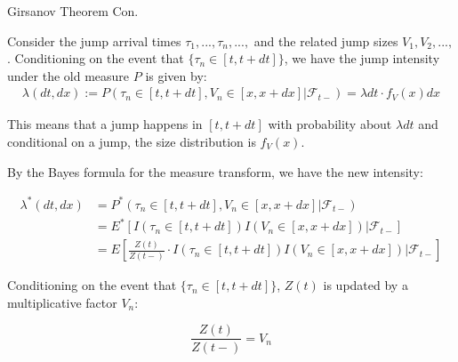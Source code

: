 \documentclass{beamer}
\begin{document}
\begin{frame}{Girsanov Theorem Con.}

    {\footnotesize \footnotesize
    \par Consider the jump arrival times $\tau_1, ..., \tau_n, ...,$ and the related jump sizes $V_1, V_2, ...,$. 
    Conditioning on the event that $\{\tau_n \in [t, t + dt]\}$, we have the jump intensity under the old measure $P$ is given by:
    \begin{align*}
        \lambda(dt, dx) := P(\tau_n \in [t, t + dt],  V_n \in [x, x + dx] | \mathcal{F}_{t-}) = \lambda dt \cdot f_V(x) dx
    \end{align*}
    \par This means that a jump happens in \([t, t + dt]\) with probability about \(\lambda dt\) and 
    conditional on a jump, the size distribution is \(f_V(x)\). 
    \par  \pause By the Bayes formula for the measure transform, we have the new intensity:

    \[
    \begin{aligned}
    \lambda^*(dt, dx) &= P^*(\tau_n \in [t, t + dt],  V_n \in [x, x + dx] | \mathcal{F}_{t-}) \\
    &= E^*[I(\tau_n \in [t, t + dt]) I(V_n \in [x, x + dx]) | \mathcal{F}_{t-}] \\
    &= E \left[ \frac{Z(t)}{Z(t-)} \cdot I(\tau_n \in [t, t + dt]) I(V_n \in [x, x + dx]) | \mathcal{F}_{t-} \right]
    \end{aligned}
    \]
    \par Conditioning on the event that $\{\tau_n \in [t, t + dt]\}$, \( Z(t) \) is updated by a multiplicative factor \( V_n \):

    \[
    \frac{Z(t)}{Z(t-)} = V_n
    \]
    }
    
\end{frame}
\end{document}
